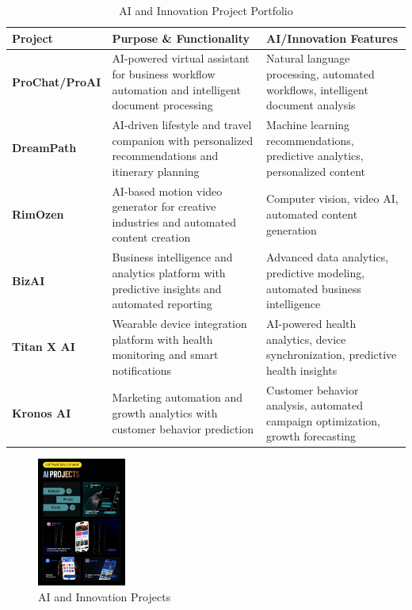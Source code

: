 \documentclass[12pt,a4paper]{report}
\newcommand{\tablealtrow}{\rowcolor{tablealt1}}
\newcommand{\project}[1]{\textcolor{projectcolor}{\textbf{#1}}}
\begin{document}
\begin{table}[h!]
\centering
\caption{AI and Innovation Project Portfolio}
\label{tab:ai_projects}
\begin{tabular}{p{4cm} p{5.5cm} p{5.5cm}}
\toprule
\rowcolor{tableheader} \textcolor{headertext}{\textbf{Project}} & \textcolor{headertext}{\textbf{Purpose \& Functionality}} & \textcolor{headertext}{\textbf{AI/Innovation Features}} \\
\midrule
\tablealtrow \project{ProChat/ProAI} & AI-powered virtual assistant for business workflow automation and intelligent document processing & Natural language processing, automated workflows, intelligent document analysis \\
\project{DreamPath} & AI-driven lifestyle and travel companion with personalized recommendations and itinerary planning & Machine learning recommendations, predictive analytics, personalized content \\
\tablealtrow \project{RimOzen} & AI-based motion video generator for creative industries and automated content creation & Computer vision, video AI, automated content generation \\
\project{BizAI} & Business intelligence and analytics platform with predictive insights and automated reporting & Advanced data analytics, predictive modeling, automated business intelligence \\
\tablealtrow \project{Titan X AI} & Wearable device integration platform with health monitoring and smart notifications & AI-powered health analytics, device synchronization, predictive health insights \\
\project{Kronos AI} & Marketing automation and growth analytics with customer behavior prediction & Customer behavior analysis, automated campaign optimization, growth forecasting \\
\bottomrule
\end{tabular}
\end{table}

\begin{figure}[h!]
\centering
    \includegraphics[width=0.26\textwidth]{Figures/ai.png}
    \caption{AI and Innovation Projects}
\end{figure}
\end{document}
